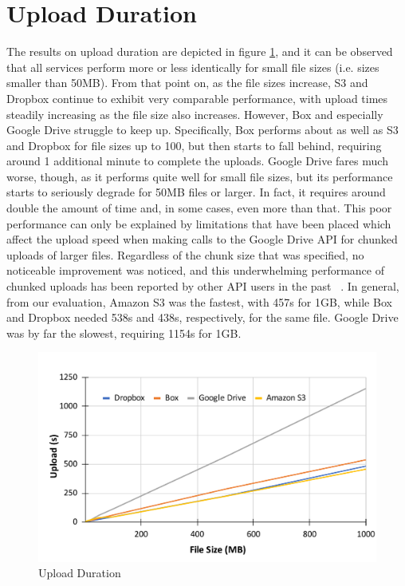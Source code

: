 \section{Upload Duration}
The results on upload duration are depicted in figure \ref{fig:upload_duration}, and it can be observed that all services perform more or less identically for small file sizes (i.e. sizes smaller than 50MB). From that point on,  as the file sizes increase, S3 and Dropbox continue to exhibit very comparable performance, with upload times steadily increasing as the file size also increases.  However, Box and especially Google Drive struggle to keep up. Specifically, Box performs about as well as S3 and Dropbox for file sizes up to 100, but then starts to fall behind, requiring around 1 additional minute to complete the uploads. Google Drive fares much worse, though, as it performs quite well for small file sizes, but its performance starts to seriously degrade for 50MB files or larger. In fact, it requires around double the amount of time and, in some cases, even more than that. This poor performance can only be explained by limitations that have been placed which affect the  upload speed when making calls to the Google Drive API for chunked uploads of larger files. Regardless of the chunk size that was specified, no noticeable improvement was noticed, and this underwhelming performance of chunked uploads has been reported by other API users in the past ~\cite{drive_chunked_performance}. In general, from our evaluation, Amazon S3 was the fastest, with 457s for 1GB, while Box and Dropbox needed 538s and 438s, respectively, for the same file. Google Drive was by far the slowest, requiring 1154s for 1GB.

\begin{figure} [!h]
	\centering
	\includegraphics[scale=0.5]{images/upload_chart}
	\caption{\label{fig:upload_duration}Upload Duration}
\end{figure}

